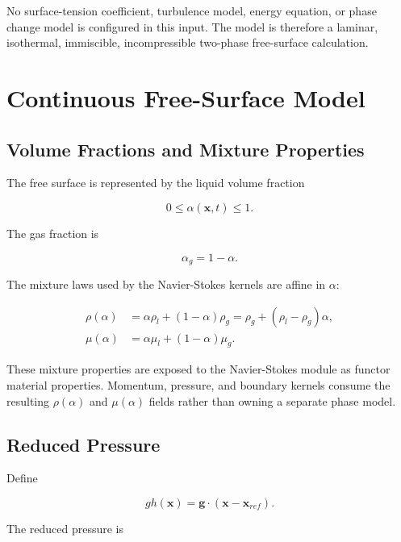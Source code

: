\documentclass[11pt]{article}
\begin{document}
No surface-tension coefficient, turbulence model, energy equation, or phase
change model is configured in this input.  The model is therefore a laminar,
isothermal, immiscible, incompressible two-phase free-surface calculation.

\section{Continuous Free-Surface Model}

\subsection{Volume Fractions and Mixture Properties}

The free surface is represented by the liquid volume fraction

\begin{equation}
  0 \le \alpha(\mathbf{x},t) \le 1.
\end{equation}

The gas fraction is

\begin{equation}
  \alpha_g = 1-\alpha.
\end{equation}

The mixture laws used by the Navier-Stokes kernels are affine in \(\alpha\):

\begin{align}
  \rho(\alpha)
  &=
  \alpha\rho_l + (1-\alpha)\rho_g
  =
  \rho_g + (\rho_l-\rho_g)\alpha,
  \label{eq:rho-alpha}
  \\
  \mu(\alpha)
  &=
  \alpha\mu_l + (1-\alpha)\mu_g.
  \label{eq:mu-alpha}
\end{align}

These mixture properties are exposed to the Navier-Stokes module as functor
material properties.  Momentum, pressure, and boundary kernels consume the
resulting \(\rho(\alpha)\) and \(\mu(\alpha)\) fields rather than owning a
separate phase model.

\subsection{Reduced Pressure}

Define

\begin{equation}
  gh(\mathbf{x}) = \mathbf{g}\cdot(\mathbf{x}-\mathbf{x}_{ref}).
\end{equation}

The reduced pressure is
\end{document}
